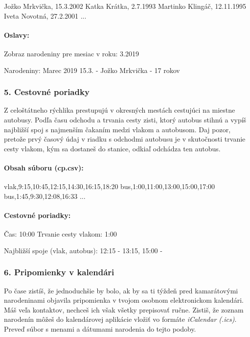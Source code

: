 \begin{code}
Jožko Mrkvička, 15.3.2002
Katka Krátka, 2.7.1993
Martinko Klingáč, 12.11.1995
Iveta Novotná, 27.2.2001
...
\end{code}

\paragraph{Oslavy:}

\begin{code}
Zobraz narodeniny pre mesiac v roku: 3.2019

Narodeniny: Marec 2019
15.3. - Jožko Mrkvička - 17 rokov
\end{code}


\subsubsection*{5. Cestovné poriadky}
Z celoštátneho rýchlika prestupujú v okresných mestách cestujúci na miestne autobusy.  Podľa času odchodu a trvania cesty zisti, ktorý autobus stihnú a vypíš najbližší spoj s najmenším čakaním medzi vlakom a autobusom. Daj pozor, pretože prvý časový údaj v riadku s odchodmi autobusu je v skutočnosti trvanie cesty vlakom, kým sa dostaneš do stanice, odkiaľ odchádza ten autobus.

\paragraph{Obsah súboru (cp.csv):}
\begin{code}
vlak,9:15,10:45,12:15,14:30,16:15,18:20
bus,1:00,11:00,13:00,15:00,17:00
bus,1:45,9:30,12:08,16:33
...
\end{code}

\paragraph{Cestovné poriadky:}
\begin{code}
Čas: 10:00
Trvanie cesty vlakom: 1:00

Najbližší spoje (vlak, autobus):
12:15 - 13:15, 15:00 -
\end{code}

\subsubsection*{6. Pripomienky v kalendári}
Po čase zistíš, že jednoduchšie by bolo, ak by sa ti týždeň pred kamarátovými narodeninami objavila pripomienka v tvojom osobnom elektronickom kalendári. Máš veľa kontaktov, nechceš ich však všetky prepisovať ručne. Zistiš, že zoznam narodenín môžeš do kalendárovej aplikácie vložiť vo formáte \textit{iCalendar (.ics)}. Preveď súbor s menami a dátumami narodenia do tejto podoby.

